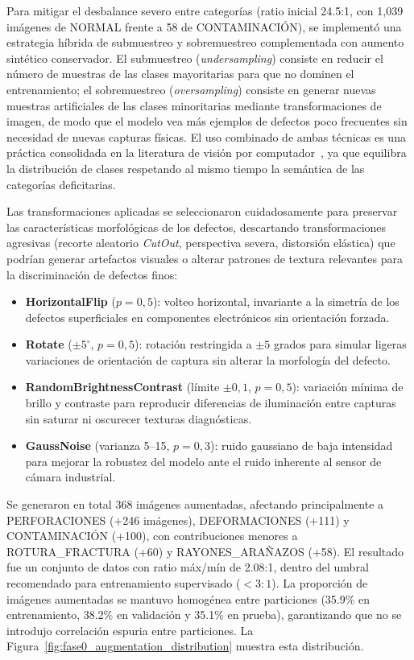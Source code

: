 Para mitigar el desbalance severo entre categorías (ratio inicial 24.5:1, con 1{,}039 imágenes de NORMAL frente a 58 de CONTAMINACIÓN), se implementó una estrategia híbrida de submuestreo y sobremuestreo complementada con aumento sintético conservador. El submuestreo (\textit{undersampling}) consiste en reducir el número de muestras de las clases mayoritarias para que no dominen el entrenamiento; el sobremuestreo (\textit{oversampling}) consiste en generar nuevas muestras artificiales de las clases minoritarias mediante transformaciones de imagen, de modo que el modelo vea más ejemplos de defectos poco frecuentes sin necesidad de nuevas capturas físicas. El uso combinado de ambas técnicas es una práctica consolidada en la literatura de visión por computador~\cite{wang2022defect}, ya que equilibra la distribución de clases respetando al mismo tiempo la semántica de las categorías deficitarias.

Las transformaciones aplicadas se seleccionaron cuidadosamente para preservar las características morfológicas de los defectos, descartando transformaciones agresivas (recorte aleatorio \textit{CutOut}, perspectiva severa, distorsión elástica) que podrían generar artefactos visuales o alterar patrones de textura relevantes para la discriminación de defectos finos:

\begin{itemize}
    \item \textbf{HorizontalFlip} ($p=0{,}5$): volteo horizontal, invariante a la simetría de los defectos superficiales en componentes electrónicos sin orientación forzada.
    \item \textbf{Rotate} ($\pm 5^{\circ}$, $p=0{,}5$): rotación restringida a $\pm 5$ grados para simular ligeras variaciones de orientación de captura sin alterar la morfología del defecto.
    \item \textbf{RandomBrightnessContrast} (límite $\pm 0{,}1$, $p=0{,}5$): variación mínima de brillo y contraste para reproducir diferencias de iluminación entre capturas sin saturar ni oscurecer texturas diagnósticas.
    \item \textbf{GaussNoise} (varianza 5--15, $p=0{,}3$): ruido gaussiano de baja intensidad para mejorar la robustez del modelo ante el ruido inherente al sensor de cámara industrial.
\end{itemize}

Se generaron en total 368 imágenes aumentadas, afectando principalmente a PERFORACIONES (+246 imágenes), DEFORMACIONES (+111) y CONTAMINACIÓN (+100), con contribuciones menores a \mbox{ROTURA\_FRACTURA} (+60) y \mbox{RAYONES\_ARAÑAZOS} (+58). El resultado fue un conjunto de datos con ratio máx/mín de 2.08:1, dentro del umbral recomendado para entrenamiento supervisado ($< 3{:}1$). La proporción de imágenes aumentadas se mantuvo homogénea entre particiones (35.9\% en entrenamiento, 38.2\% en validación y 35.1\% en prueba), garantizando que no se introdujo correlación espuria entre particiones. La Figura~\ref{fig:fase0_augmentation_distribution} muestra esta distribución.

